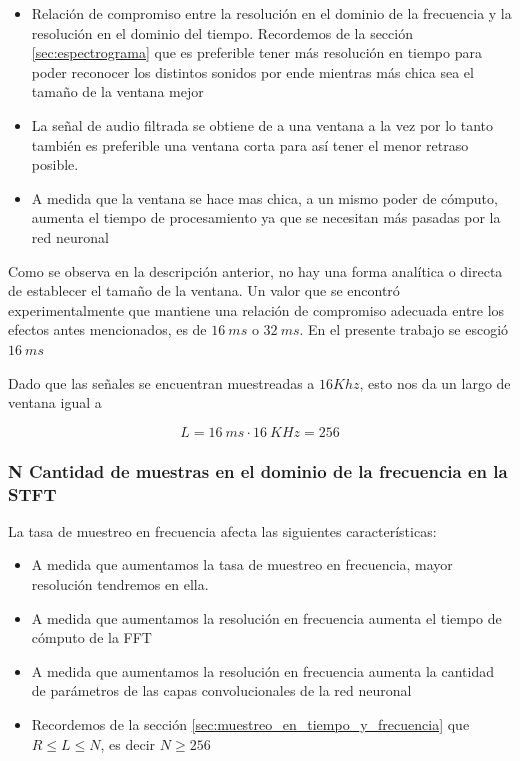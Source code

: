 \begin{itemize}
	\item Relación de compromiso entre la resolución en el dominio de la frecuencia y la resolución en el dominio del tiempo. Recordemos de la sección \ref{sec:espectrograma} que es preferible tener más resolución en tiempo para poder reconocer los distintos sonidos por ende mientras más chica sea el tamaño de la ventana mejor
	\item La señal de audio filtrada se obtiene de a una ventana a la vez por lo tanto también es preferible una ventana corta para así tener el menor retraso posible.
	\item A medida que la ventana se hace mas chica, a un mismo poder de cómputo, aumenta el tiempo de procesamiento ya que se necesitan más pasadas por la red neuronal
\end{itemize}

Como se observa en la descripción anterior, no hay una forma analítica o directa de establecer el tamaño de la ventana. Un valor que se encontró experimentalmente que mantiene una relación de compromiso adecuada entre los efectos antes mencionados, es de $\SI{16}{ms}$ o $\SI{32}{ms}$. En el presente trabajo se escogió $\SI{16}{ms}$

Dado que las señales se encuentran muestreadas a $16 Khz$, esto nos da un largo de ventana igual a

\begin{equation*}
	L = \SI{16}{ms} \cdot \SI{16}{KHz} = 256
\end{equation*}

\subsubsection{N Cantidad de muestras en el dominio de la frecuencia en la STFT}
\label{sec:cantidad_muestras_frecuencia}

La tasa de muestreo en frecuencia afecta las siguientes características:

\begin{itemize}
	\item A medida que aumentamos la tasa de muestreo en frecuencia, mayor resolución tendremos en ella.
	\item A medida que aumentamos la resolución en frecuencia aumenta el tiempo de cómputo de la FFT
	\item A medida que aumentamos la resolución en frecuencia aumenta la cantidad de parámetros de las capas convolucionales de la red neuronal
	\item Recordemos de la sección \ref{sec:muestreo_en_tiempo_y_frecuencia} que $R \leq L \leq N$, es decir $N \ge 256$
\end{itemize}

